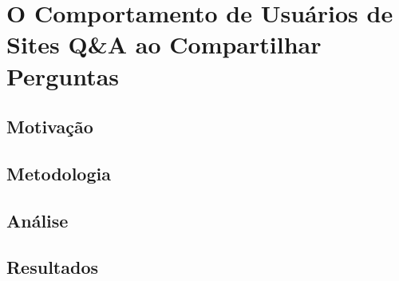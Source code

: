 \chapter{O Comportamento de Usuários de Sites Q\&A ao Compartilhar Perguntas}

\section{Motivação}
\section{Metodologia}
\section{Análise}
\section{Resultados}